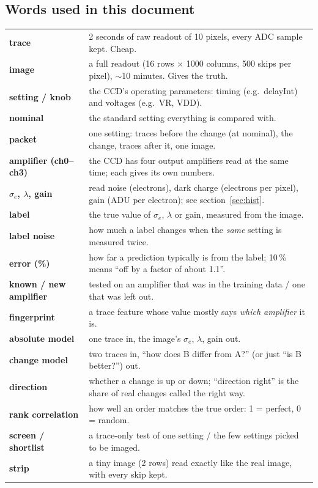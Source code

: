 \documentclass[11pt]{article}
\begin{document}
\subsection*{Words used in this document}
\small
\begin{tabular}{>{\bfseries}p{3.3cm}p{12.6cm}}
\toprule
trace & 2 seconds of raw readout of 10 pixels, every ADC sample kept. Cheap.\\
image & a full readout (16 rows $\times$ 1000 columns, 500 skips per pixel), $\sim$10 minutes. Gives the truth.\\
setting / knob & the CCD's operating parameters: timing (e.g.\ delayInt) and voltages (e.g.\ VR, VDD).\\
nominal & the standard setting everything is compared with.\\
packet & one setting: traces before the change (at nominal), the change, traces after it, one image.\\
amplifier (ch0--ch3) & the CCD has four output amplifiers read at the same time; each gives its own numbers.\\
$\sigma_e$, $\lambda$, gain & read noise (electrons), dark charge (electrons per pixel), gain (ADU per electron); see section~\ref{sec:hist}.\\
label & the true value of $\sigma_e$, $\lambda$ or gain, measured from the image.\\
label noise & how much a label changes when the \emph{same} setting is measured twice.\\
error (\%) & how far a prediction typically is from the label; 10\,\% means ``off by a factor of about 1.1''.\\
known / new amplifier & tested on an amplifier that was in the training data / one that was left out.\\
fingerprint & a trace feature whose value mostly says \emph{which amplifier} it is.\\
absolute model & one trace in, the image's $\sigma_e$, $\lambda$, gain out.\\
change model & two traces in, ``how does B differ from A?'' (or just ``is B better?'') out.\\
direction & whether a change is up or down; ``direction right'' is the share of real changes called the right way.\\
rank correlation & how well an order matches the true order: 1 = perfect, 0 = random.\\
screen / shortlist & a trace-only test of one setting / the few settings picked to be imaged.\\
strip & a tiny image (2 rows) read exactly like the real image, with every skip kept.\\
\bottomrule
\end{tabular}
\normalsize
\end{document}
